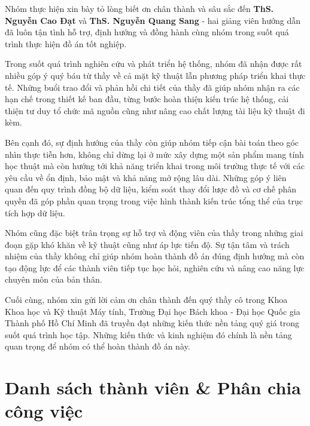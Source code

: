 \documentclass[twoside, final]{hcmut-report}
\begin{document}
Nhóm thực hiện xin bày tỏ lòng biết ơn chân thành và sâu sắc đến \textbf{ThS. Nguyễn Cao Đạt} và \textbf{ThS. Nguyễn Quang Sang} - hai giảng viên hướng dẫn đã luôn tận tình hỗ trợ, định hướng và đồng hành cùng nhóm trong suốt quá trình thực hiện đồ án tốt nghiệp.

Trong suốt quá trình nghiên cứu và phát triển hệ thống, nhóm đã nhận được rất nhiều góp ý quý báu từ thầy về cả mặt kỹ thuật lẫn phương pháp triển khai thực tế. Những buổi trao đổi và phản hồi chi tiết của thầy đã giúp nhóm nhận ra các hạn chế trong thiết kế ban đầu, từng bước hoàn thiện kiến trúc hệ thống, cải thiện tư duy tổ chức mã nguồn cũng như nâng cao chất lượng tài liệu kỹ thuật đi kèm.

Bên cạnh đó, sự định hướng của thầy còn giúp nhóm tiếp cận bài toán theo góc nhìn thực tiễn hơn, không chỉ dừng lại ở mức xây dựng một sản phẩm mang tính học thuật mà còn hướng tới khả năng triển khai trong môi trường thực tế với các yêu cầu về ổn định, bảo mật và khả năng mở rộng lâu dài. Những góp ý liên quan đến quy trình đồng bộ dữ liệu, kiểm soát thay đổi lược đồ và cơ chế phân quyền đã góp phần quan trọng trong việc hình thành kiến trúc tổng thể của trục tích hợp dữ liệu.

Nhóm cũng đặc biệt trân trọng sự hỗ trợ và động viên của thầy trong những giai đoạn gặp khó khăn về kỹ thuật cũng như áp lực tiến độ. Sự tận tâm và trách nhiệm của thầy không chỉ giúp nhóm hoàn thành đồ án đúng định hướng mà còn tạo động lực để các thành viên tiếp tục học hỏi, nghiên cứu và nâng cao năng lực chuyên môn của bản thân.

Cuối cùng, nhóm xin gửi lời cảm ơn chân thành đến quý thầy cô trong Khoa Khoa học và Kỹ thuật Máy tính, Trường Đại học Bách khoa - Đại học Quốc gia Thành phố Hồ Chí Minh đã truyền đạt những kiến thức nền tảng quý giá trong suốt quá trình học tập. Những kiến thức và kinh nghiệm đó chính là nền tảng quan trọng để nhóm có thể hoàn thành đồ án này.

\newpage

\section*{Danh sách thành viên \& Phân chia công việc}
\end{document}
